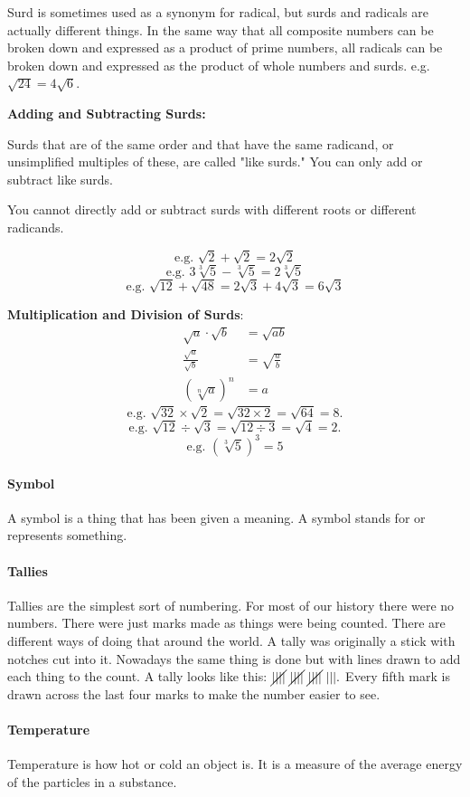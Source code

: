 \documentclass[12pt]{article}
\begin{document}
Surd is sometimes used as a synonym for radical, but surds and radicals are actually different things. In the same way that all composite numbers can be broken down and expressed as a product of prime numbers, all radicals can be broken down and expressed as the product of whole numbers and surds. e.g. $\sqrt{24}=4\sqrt{6}$.

\textbf{Adding and Subtracting Surds:}

Surds that are of the same order and that have the same radicand, or unsimplified multiples of these, are called "like surds." You can only add or subtract like surds.

You cannot directly add or subtract surds with different roots or different radicands.

$$\text{e.g. }\sqrt{2}+\sqrt{2}=2\sqrt{2}$$
$$\text{e.g. }3\sqrt[3]{5}-\sqrt[3]{5}=2\sqrt[3]{5}$$
$$\text{e.g. }\sqrt{12}+\sqrt{48}=2\sqrt{3}+4\sqrt{3}=6\sqrt{3}$$


\textbf{Multiplication and Division of Surds}:
\begin{align*}
\sqrt{a} \cdot \sqrt{b}&=\sqrt{ab}\\
\frac{\sqrt{a}}{\sqrt{b}}&=\sqrt{\frac{a}{b}}\\
(\sqrt[n]{a})^n&=a
\end{align*}
$$\text{e.g. }\sqrt{32}\times\sqrt{2}=\sqrt{32\times2}=\sqrt{64}=8.$$
$$\text{e.g. }\sqrt{12}\div\sqrt{3}=\sqrt{12\div3}=\sqrt{4}=2.$$
$$\text{e.g. }(\sqrt[3]{5})^3=5$$

\paragraph{Symbol}
A symbol is a thing that has been given a meaning. A symbol stands for or represents something.

\paragraph{Tallies} Tallies are the simplest sort of numbering. For most of our history there were no numbers. There were just marks made as things were being counted. There are different ways of doing that around the world. A tally was originally a stick with notches cut into it. Nowadays the same thing is done but with lines drawn to add each thing to the count. A tally looks like this: $\cancel{||||}\ \cancel{||||}\ \cancel{||||}\ |||.$ Every fifth mark is drawn across the last four marks to make the number easier to see.

\paragraph{Temperature}
Temperature is how hot or cold an object is. It is a measure of the average energy of the particles in a substance.
\end{document}
